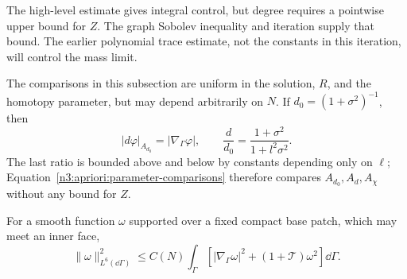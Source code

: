 The high-level estimate gives integral control, but degree requires a
pointwise upper bound for $Z$. The graph Sobolev inequality and
iteration supply that bound. The earlier polynomial trace estimate,
not the constants in this iteration, will control the mass limit.

The comparisons in this subsection are uniform in the solution,
$R$, and the homotopy parameter, but may depend arbitrarily on $N$.
If $d_0=(1+\sigma^2)^{-1}$, then
\[
 |d\varphi|_{A_{d_0}}=|\nabla_\Gamma\varphi|,
 \qquad
 \frac{d}{d_0}=\frac{1+\sigma^2}{1+l^2\sigma^2}.
\]
The last ratio is bounded above and below by constants depending
only on $\ell$; Equation~\eqref{n3:apriori:parameter-comparisons}
therefore compares $A_{d_0},A_d,A_\chi$ without any bound for $Z$.

\begin{lemma}
\label{n3:apriori:sobolev}
For a smooth function $\omega$ supported over a fixed compact base
patch, which may meet an inner face,
\begin{equation}
 \|\omega\|_{L^6(\dd\Gamma)}^2
 \le C(N)\int_\Gamma
       \left[|\nabla_\Gamma\omega|^2+
                            (1+\mathcal T)\omega^2\right]\dd\Gamma.
 \label{n3:apriori:sobolev-equation}
\end{equation}
\end{lemma}

